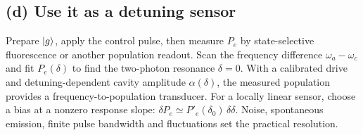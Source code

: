 \subsection*{(d) Use it as a detuning sensor}
Prepare \(\left\lvert g\right\rangle\), apply the control pulse,
then measure \(P_e\) by state-selective
fluorescence or another population readout.
Scan the frequency difference \(\omega_a-\omega_c\)
and fit \(P_e(\delta)\) to find the two-photon
resonance \(\delta=0\). With a calibrated
drive and detuning-dependent cavity amplitude
\(\alpha(\delta)\), the measured population
provides a frequency-to-population transducer.
For a locally linear sensor, choose a bias
at a nonzero response slope:
\(\delta P_e\simeq P'_e(\delta_0)\,\delta\delta\).
Noise, spontaneous emission, finite pulse
bandwidth and fluctuations set the practical
resolution.
